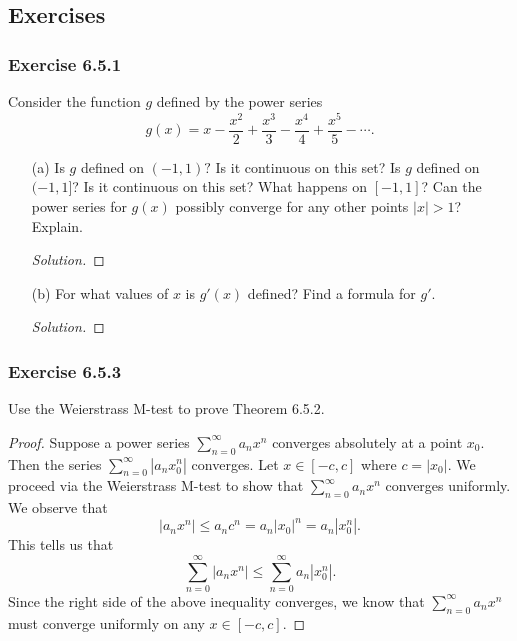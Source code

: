 \subsection{Exercises}

\subsubsection{Exercise 6.5.1} Consider the function \( g  \) defined by the power series 
\[  g(x) = x - \frac{ x^2  }{ 2  }  + \frac{ x^3  }{  3  }  - \frac{ x^4  }{ 4  }  + \frac{ x^5  }{  5  }  - \dotsb . \]
\begin{enumerate}
    \item[(a)] Is \( g  \) defined on \( (-1,1)?  \) Is it continuous on this set? Is \( g  \) defined on \( (-1,1]  \)? Is it continuous on this set? What happens on \( [-1,1]  \)? Can the power series for \( g(x) \) possibly converge for any other points \( | x  | > 1  \)? Explain.
        \begin{proof}[Solution]
        
        \end{proof}
    \item[(b)] For what values of \( x \) is \( g'(x)  \) defined? Find a formula for \( g' \).
        \begin{proof}[Solution]
        
        \end{proof}
\end{enumerate}

\subsubsection{Exercise 6.5.3} Use the Weierstrass M-test to prove Theorem 6.5.2.
\begin{proof}
    Suppose a power series \( \sum_{ n=0  }^{  \infty   } a_n x^n  \) converges absolutely at a point \( x_0  \). Then the series \(  \sum_{ n=0  }^{  \infty  } | a_n x_0^n |  \) converges. Let \( x \in [-c , c ] \) where \( c = | x_0  |  \). We proceed via the Weierstrass M-test to show that \( \sum_{ n=0  }^{ \infty  } a_n x^n  \) converges uniformly. We observe that 
    \[  | a_n x^n  |  \leq a_n c^n = a_n | x_0  |^n = a_n | x_0^n | .  \]
    This tells us that 
    \[  \sum_{ n=0 }^{  \infty   } | a_n x^n | \leq \sum_{ n=0  }^{ \infty  } a_n | x_0^n  |.   \]
    Since the right side of the above inequality converges, we know that \( \sum_{ n=0  }^{ \infty  } a_n x^n  \) must converge uniformly on any \( x \in [-c ,c ]  \).
\end{proof}



